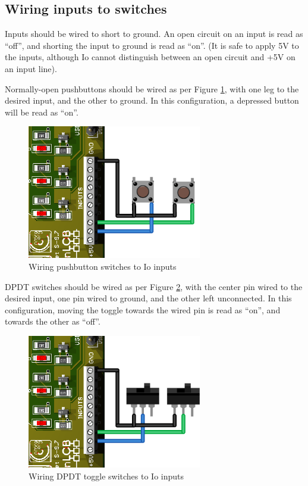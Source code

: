 \documentclass[12pt]{book}
\begin{document}
\subsection{Wiring inputs to switches}

Inputs should be wired to short to ground. An open circuit on an input is read as ``off'', and shorting the input to ground is read as ``on''. (It is safe to apply 5V to the inputs, although Io cannot distinguish between an open circuit and +5V on an input line).

Normally-open pushbuttons should be wired as per Figure \ref{pushbutton}, with one leg to the desired input, and the other to ground. In this configuration, a depressed button will be read as ``on''.

\begin{figure}[htbp]
\begin{center}
\includegraphics[width=3in]{images/Inputs-pushbutton.png}
\caption{Wiring pushbutton switches to Io inputs}
\label{pushbutton}
\end{center}
\end{figure}

DPDT switches should be wired as per Figure \ref{DPDT}, with the center pin wired to the desired input, one pin wired to ground, and the other left unconnected. In this configuration, moving the toggle towards the wired pin is read as ``on'', and towards the other as ``off''.

\begin{figure}[htbp]
\begin{center}
\includegraphics[width=3in]{images/Inputs-DPDT.png}
\caption{Wiring DPDT toggle switches to Io inputs}
\label{DPDT}
\end{center}
\end{figure}
\end{document}
